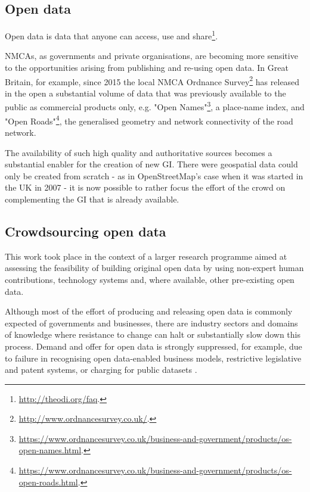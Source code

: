 \subsection{Open data}

    Open data is data that anyone can access, use and share\footnote{\url{http://theodi.org/faq}.}. 
    
    NMCAs, as governments and private organisations, are becoming more sensitive to the opportunities arising from publishing and re-using open data. In Great Britain, for example, since 2015 the local NMCA Ordnance Survey\footnote{\url{http://www.ordnancesurvey.co.uk/}.} has released in the open a substantial volume of data that was previously available to the public as commercial products only, e.g. "Open Names"\footnote{\url{https://www.ordnancesurvey.co.uk/business-and-government/products/os-open-names.html}.}, a place-name index, and "Open Roads"\footnote{\url{https://www.ordnancesurvey.co.uk/business-and-government/products/os-open-roads.html}.}, the generalised geometry and network connectivity of the road network.
    
    The availability of such high quality and authoritative sources becomes a substantial enabler for the creation of new GI. There were geospatial data could only be created from scratch - as in OpenStreetMap's case when it was started in the UK in 2007 - it is now possible to rather focus the effort of the crowd on complementing the GI that is already available.

\subsection{Crowdsourcing open data}

    This work took place in the context of a larger research programme aimed at assessing the feasibility of building original open data by using non-expert human contributions, technology systems and, where available, other pre-existing open data. 
    
    Although most of the effort of producing and releasing open data is commonly expected of governments and businesses, there are industry sectors and domains of knowledge where resistance to change can halt or substantially slow down this process. Demand and offer for open data is strongly suppressed, for example, due to failure in recognising open data-enabled business models, restrictive legislative and patent systems, or charging for public datasets \cite{shadboltpaf}. 
    
